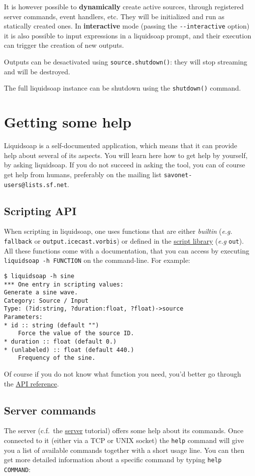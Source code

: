 \documentclass{book}
\newcommand{\cf}{c.f.~}
\begin{document}
It is however possible to \textbf{dynamically} create active sources,
through registered server commands, event handlers, etc.
They will be initialized and run as statically created ones.
In \textbf{interactive} mode (passing the \verb+--interactive+ option)
it is also possible to input expressions in a liquidsoap prompt,
and their execution can trigger the creation of new outputs.

Outputs can be desactivated using \verb+source.shutdown()+:
they will stop streaming and will be destroyed.

The full liquidsoap instance
can be shutdown using the \verb+shutdown()+ command.

\section{Getting some help}
Liquidsoap is a self-documented application, which means that it can provide
help about several of its aspects.  You will learn here how to get help by
yourself, by asking liquidsoap. If you do not succeed in asking the tool, you
can of course get help from humans, preferably on the mailing list
\verb+savonet-users@lists.sf.net+.

\subsection{Scripting API}
When scripting in liquidsoap, one uses functions that are either \emph{builtin}
(\emph{e.g.} \verb+fallback+ or \verb+output.icecast.vorbis+) or defined in the
\href{script_loading.html}{script library} (\emph{e.g} \verb+out+).  All these
functions come with a documentation, that you can access by executing
\verb+liquidsoap -h FUNCTION+ on the command-line. For example:

\begin{verbatim}
$ liquidsoap -h sine
*** One entry in scripting values:
Generate a sine wave.
Category: Source / Input
Type: (?id:string, ?duration:float, ?float)->source
Parameters:
* id :: string (default "")
    Force the value of the source ID.
* duration :: float (default 0.)
* (unlabeled) :: float (default 440.)
    Frequency of the sine.
\end{verbatim}
Of course if you do not know what function you need, you'd better go through the
\href{reference.html}{API reference}.

\subsection{Server commands}
The server (\cf the \href{server.html}{server} tutorial) offers some help
about its commands.  Once connected to it (either via a TCP or UNIX socket) the
\verb+help+ command will give you a list of available commands together with a
short usage line.  You can then get more detailed information about a specific
command by typing \verb+help COMMAND+:
\end{document}

